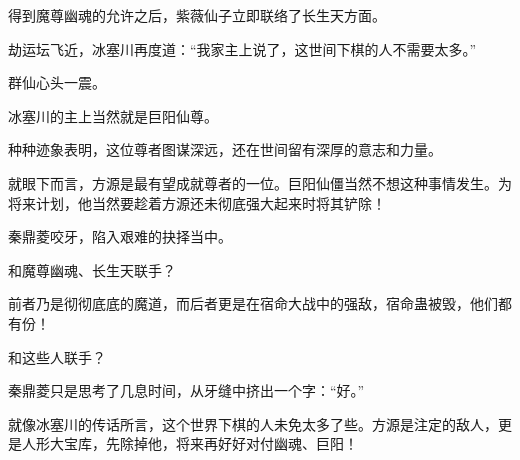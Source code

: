 \begin{this_body}
得到魔尊幽魂的允许之后，紫薇仙子立即联络了长生天方面。

劫运坛飞近，冰塞川再度道：“我家主上说了，这世间下棋的人不需要太多。”

群仙心头一震。

冰塞川的主上当然就是巨阳仙尊。

种种迹象表明，这位尊者图谋深远，还在世间留有深厚的意志和力量。

就眼下而言，方源是最有望成就尊者的一位。巨阳仙僵当然不想这种事情发生。为将来计划，他当然要趁着方源还未彻底强大起来时将其铲除！

秦鼎菱咬牙，陷入艰难的抉择当中。

和魔尊幽魂、长生天联手？

前者乃是彻彻底底的魔道，而后者更是在宿命大战中的强敌，宿命蛊被毁，他们都有份！

和这些人联手？

秦鼎菱只是思考了几息时间，从牙缝中挤出一个字：“好。”

就像冰塞川的传话所言，这个世界下棋的人未免太多了些。方源是注定的敌人，更是人形大宝库，先除掉他，将来再好好对付幽魂、巨阳！

\end{this_body}

